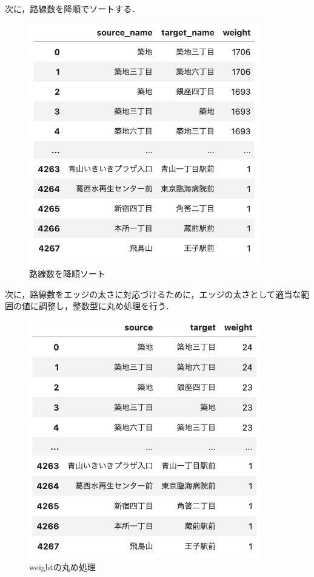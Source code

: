 \documentclass[12pt,a4paper,dvipdfmx,titlepage]{jsarticle}
\begin{document}
次に，路線数を降順でソートする．
\begin{figure}[H]
    \centering
    \includegraphics[width=10cm]{./img/table3.png}
    \caption{路線数を降順ソート}
    \label{fig:table3}
\end{figure}

次に，路線数をエッジの太さに対応づけるために，エッジの太さとして適当な範囲の値に調整し，整数型に丸め処理を行う．
\begin{figure}[H]
    \centering
    \includegraphics[width=10cm]{./img/table4.png}
    \caption{weightの丸め処理}
    \label{fig:table4}
\end{figure}
\end{document}
